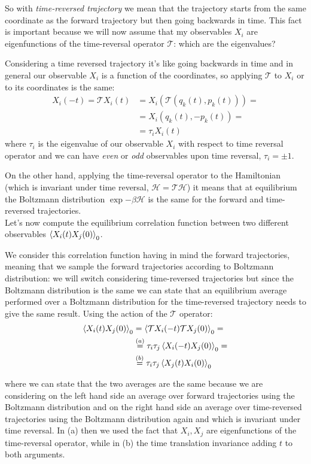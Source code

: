 \documentclass[\main/main.tex]{subfiles}
\begin{document}
So with \textit{time-reversed trajectory} we mean that the trajectory starts from the same coordinate as the forward trajectory but then going backwards in time. This fact is important because we will now assume that my observables $X_i$ are eigenfunctions of the time-reversal operator $\mathcal{T}$: which are the eigenvalues?

Considering a time reversed trajectory it's like going backwards in time and in general our observable $X_i$ is a function of the coordinates, so applying $\mathcal{T}$ to $X_i$ or to its coordinates is the same:
\begin{align}
    X_i(-t)=\mathcal{T}X_i(t)&=X_i(\mathcal{T}(q_k(t),p_k(t)))= \\
    &=X_i(q_k(t),-p_k(t))= \\
    &=\tau_iX_i(t)
\end{align}
where $\tau_i$ is the eigenvalue of our observable $X_i$ with respect to time reversal operator and we can have \textit{even} or \textit{odd} observables upon time reversal, $\tau_i=\pm 1$.

On the other hand, applying the time-reversal operator to the Hamiltonian (which is invariant under time reversal, $\mathcal{H}=\mathcal{T}\mathcal{H}$) it means that at equilibrium the Boltzmann distribution $\exp{-\beta \mathcal{H}}$ is the same for the forward and time-reversed trajectories. \\

Let's now compute the equilibrium correlation function between two different observables $\left\langle X_i(t)X_j(0) \right\rangle_0$.

We consider this correlation function having in mind the forward trajectories, meaning that we sample the forward trajectories according to Boltzmann distribution: we will switch considering time-reversed trajectories but since the Boltzmann distribution is the same we can state that an equilibrium average performed over a Boltzmann distribution for the time-reversed trajectory needs to give the same result. Using the action of the $\mathcal{T}$ operator:
\begin{align}
    \left\langle X_i(t)X_j(0) \right\rangle_0 &=\left\langle \mathcal{T}X_i(-t)\mathcal{T}X_j(0) \right\rangle_0 =\\ &\overset{(a)}{=} \tau_i\tau_j\left\langle X_i(-t)X_j(0) \right\rangle_0 = \\
    &\overset{(b)}{=}\tau_i\tau_j\left\langle X_j(t)X_i(0) \right\rangle_0
\end{align}

where we can state that the two averages are the same because we are considering on the left hand side an average over forward trajectories using the Boltzmann distribution and on the right hand side an average over time-reversed trajectories using the Boltzmann distribution again and which is invariant under time reversal. In (a) then we used the fact that $X_i,X_j$ are eigenfunctions of the time-reversal operator, while in (b) the time translation invariance adding $t$ to both arguments.
\end{document}

